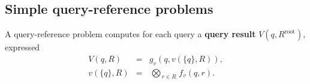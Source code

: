 \documentclass[twoside,leqno,twocolumn]{article}
\newcommand{\bigvec}[1]{\mathop{\overrightarrow{#1}}}
\newcommand{\summary}{\delta}
\newcommand{\defterm}[1]{{\bf #1}}
\newcommand{\kdroot}[1]{#1^{\text{root}}}
\newcommand{\lo}[1]{#1^{l}}
\newcommand{\up}[1]{#1^{u}}
\newcommand{\distlo}{\lo{d}}
\newcommand{\distup}{\up{d}}
\newcommand{\dist}[2]{d(#1,#2)}
\newcommand{\nameOp}[2]{\mathop{#1\nolimits\!\!_{#2}}}
\newcommand{\nameop}[2]{#1_{\!#2}}
\newcommand{\myOp}[1]{\nameOp{\bigotimes}{#1}}
\newcommand{\myop}[1]{\nameop{\otimes}{#1}}
\newcommand{\letterglob}{\psi}
\newcommand{\opglob}{\myop{\letterglob}}
\newcommand{\fglob}{f_{\letterglob}}
\newcommand{\canpruneglob}{C_{\letterglob}}
\newcommand{\deltaglob}{\summary_{\letterglob}}
\newcommand{\letterqr}{v}
\newcommand{\outqr}{V}
\newcommand{\Opqr}{\myOp{\letterqr}}
\newcommand{\fqr}{f_{\letterqr}}
\newcommand{\gqr}{g_{\letterqr}}
\newcommand{\inqrv}{v}
\newcommand{\letterstat}{s}
\newcommand{\outstat}{\sigma}
\newcommand{\opstat}{\myop{\letterstat}}
\newcommand{\fstat}{f_{\letterstat}}
\begin{document}
%


\subsection{Simple query-reference problems}
A query-reference problem computes for each query a \defterm{query result} $\outqr(q, \kdroot{R})$, expressed
\begin{eqnarray}
\outqr(q, R) &=& \gqr(q, \inqrv(\{q\}, R)),
\\
\inqrv(\{q\}, R) &=& \Opqr_{r \in R} \fqr(q, r).
\label{eqn:qrdef}
\end{eqnarray}
\end{document}
